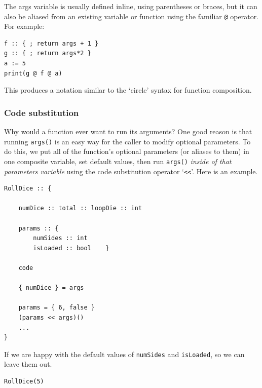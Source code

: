 \documentclass{article}
\newenvironment{code}{
       \begin{list}{}{
               \setlength{\leftmargin}{.4in}
               \setlength{\rightmargin}{0in}
               \setlength{\topsep}{.2in}
       }
       \small
       \item[] }
       { \end{list}   }
\begin{document}
The args variable is usually defined inline, using parentheses or braces, but it can also be aliased from an existing variable or function using the familiar \verb#@# operator.  For example:

\begin{code} \begin{verbatim}
f :: { ; return args + 1 }
g :: { ; return args*2 }
a := 5
print(g @ f @ a)
\end{verbatim} \end{code}

\noindent This produces a notation similar to the `circle' syntax for function composition.

 





\subsubsection{Code substitution}

Why would a function ever want to run its arguments?  One good reason is that running \verb#args()# is an easy way for the caller to modify optional parameters.  To do this, we put all of the function's optional parameters (or aliases to them) in one composite variable, set default values, then run \verb#args()# \emph{inside of that parameters variable} using the code substitution operator `\verb#<<#'.  Here is an example.

\begin{code} \begin{verbatim}
RollDice :: {
    
    numDice :: total :: loopDie :: int
    
    params :: {
        numSides :: int
        isLoaded :: bool    }
    
    code
    
    { numDice } = args
    
    params = { 6, false }
    (params << args)()
    ...
}
\end{verbatim} \end{code}

\noindent If we are happy with the default values of \verb#numSides# and \verb#isLoaded#, so we can leave them out.

\begin{code} \begin{verbatim}
RollDice(5)
\end{verbatim} \end{code}
\end{document}
